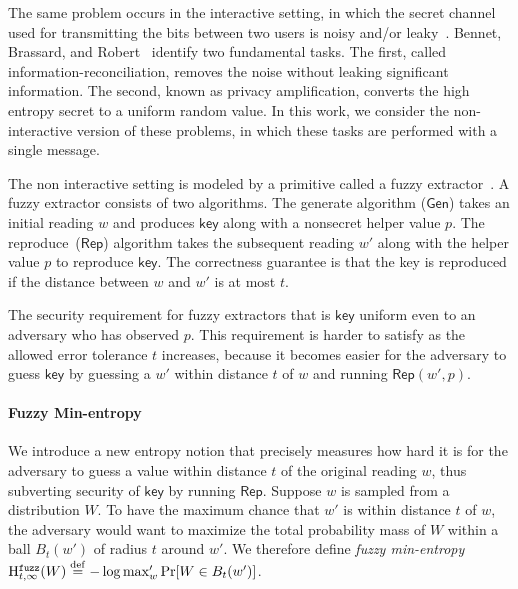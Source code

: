 \documentclass[11pt]{article}
\newcommand{\class}[1]{{\ensuremath{\mathsf{#1}}}}
\newcommand{\key}{\ensuremath{\class{key}}\xspace}
\newcommand{\gen}{\ensuremath{\class{Gen}}\xspace}
\newcommand{\rep}{\ensuremath{\class{Rep}}\xspace}
\newcommand{\eqdef}{\stackrel{\rm def}{=}}
\newcommand{\Hfuzz}{\mathrm{H}^{\mathtt{fuzz}}_{t,\infty}}
\begin{document}
The same problem occurs in the interactive setting, in which the secret channel used for transmitting the bits between two users is noisy and/or leaky~\cite{Wyner75}. Bennet, Brassard, and Robert~\cite{bennett1988privacy} identify two fundamental tasks.  The first, called information-reconciliation, removes the noise without leaking significant information. The second, known as privacy amplification, converts the high entropy secret to a uniform random value.  In this work, we consider the non-interactive version of these problems, in which these tasks are performed with a single message.

The non interactive setting is modeled by a primitive called a fuzzy extractor~\cite{DBLP:journals/siamcomp/DodisORS08}.  %
A fuzzy extractor consists of two algorithms. The  generate algorithm ($\gen$)  takes an initial reading $w$ and produces $\key$ along with a nonsecret helper value $p$.  The reproduce~($\rep$) algorithm takes the subsequent reading $w'$ along with the helper value $p$ to reproduce $\key$.   The correctness guarantee is that the key is reproduced if the distance between $w$ and $w'$ is at most $t$. 

The security requirement for fuzzy extractors that is $\key$ uniform even to an adversary who has observed $p$.   This requirement is  harder to satisfy as the allowed error tolerance $t$ increases, because it becomes easier for the adversary to guess $\key$ by guessing a $w'$ within distance $t$ of $w$ and running $\rep(w',p)$.


\paragraph{Fuzzy Min-entropy}
We introduce a new entropy notion that precisely measures how hard it is for the adversary to guess a value within distance $t$ of the original reading $w$, thus subverting security of $\key$ by running $\rep$. Suppose $w$ is sampled from a distribution $W$.   To have the maximum chance that $w'$ is within distance $t$ of $w$, the adversary would want to maximize the total probability mass of $W$ within a ball $B_t(w')$ of radius $t$ around $w'$.
We  therefore define \emph{fuzzy min-entropy} $\Hfuzz(W) \eqdef -\log \max_w' \Pr[W\in B_t(w')]$. 
\end{document}
